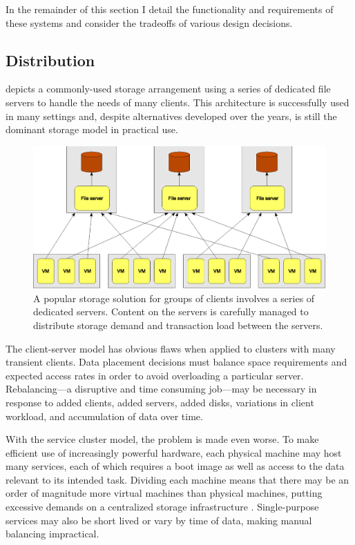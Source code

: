 In the remainder of this section I detail the functionality and requirements of these systems and consider the tradeoffs of various design decisions.

\subsection{Distribution}

 depicts a commonly-used storage arrangement using a series of dedicated file servers to handle the needs of many clients. This architecture is successfully used in many settings and, despite alternatives developed over the years, is still the dominant storage model in practical use.

\begin{figure}[tp]
\centering
\includegraphics[width=\figwidth]{figures/client-server}
\caption[Machines served by a series of client-server file systems]{A popular storage solution for groups of clients involves a series of dedicated servers. Content on the servers is carefully managed to distribute storage demand and transaction load between the servers.}
\label{fig:client-server}
\end{figure}

The client-server model has obvious flaws when applied to clusters with many transient clients. Data placement decisions must balance space requirements and expected access rates in order to avoid overloading a particular server. Rebalancing---a disruptive and time consuming job---may be necessary in response to added clients, added servers, added disks, variations in client workload, and accumulation of data over time.

With the service cluster model, the problem is made even worse. To make efficient use of increasingly powerful hardware, each physical machine may host many services, each of which requires a boot image as well as access to the data relevant to its intended task. Dividing each machine means that there may be an order of magnitude more virtual machines than physical machines, putting excessive demands on a centralized storage infrastructure \cite{hospodor}. Single-purpose services may also be short lived or vary by time of data, making manual balancing impractical.

